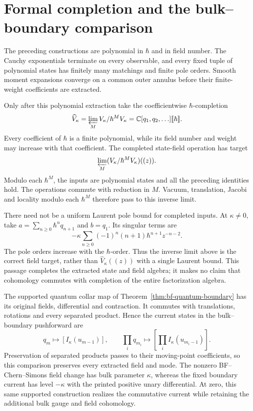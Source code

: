 \section{Formal completion and the bulk--boundary comparison}

The preceding constructions are polynomial in $\hbar$ and in field
number.  The Cauchy exponentials terminate on every observable, and
every fixed tuple of polynomial states has finitely many matchings
and finite pole orders.  Smooth moment expansions converge on a
common outer annulus before their finite-weight coefficients are
extracted.

Only after this polynomial extraction take the coefficientwise
$\hbar$-completion
\[
 \widehat V_\kappa
 =\varprojlim_M V_\kappa/\hbar^MV_\kappa
 =\mathbb C[q_1,q_2,\ldots]\llbracket\hbar\rrbracket.
\]
Every coefficient of $\hbar$ is a finite polynomial, while its field
number and weight may increase with that coefficient.  The completed
state-field operation has target
\[
 \varprojlim_M
       (V_\kappa/\hbar^MV_\kappa)((z)).
\]
Modulo each $\hbar^M$, the inputs are polynomial states and all the
preceding identities hold.  The operations commute with reduction
in $M$.  Vacuum, translation, Jacobi and locality modulo each
$\hbar^M$ therefore pass to this inverse limit.

There need not be a uniform Laurent pole bound for completed inputs.
At $\kappa\ne0$, take
$a=\sum_{n\ge0}\hbar^nq_{n+1}$ and $b=q_1$.
Its singular terms are
\[
 -\kappa\sum_{n\ge0}(-1)^n(n+1)\hbar^{n+1}z^{-n-2}.
\]
The pole orders increase with the $\hbar$-order.  Thus the inverse
limit above is the correct field target, rather than
$\widehat V_\kappa((z))$ with a single Laurent bound.  This passage
completes the extracted state and field algebra; it makes no claim
that cohomology commutes with completion of the entire factorization
algebra.

The supported quantum collar map of
Theorem~\ref{thm:bf-quantum-boundary} has its original fields,
differential and contraction.  It commutes with translations,
rotations and every separated product.  Hence the current states
in the bulk--boundary pushforward are
\[
 q_m\longmapsto[I_\kappa(u_{m-1})],\qquad
 \prod_iq_{m_i}\longmapsto
                  \left[\prod_i I_\kappa(u_{m_i-1})\right].
\]
Preservation of separated products passes to their moving-point
coefficients, so this comparison preserves every extracted field
and mode.  The nonzero BF--Chern--Simons field change has bulk
parameter $\kappa$, whereas the fixed boundary current has level
$-\kappa$ with the printed positive unary differential.  At zero,
this same supported construction realizes the commutative current
while retaining the additional bulk gauge and field cohomology.

